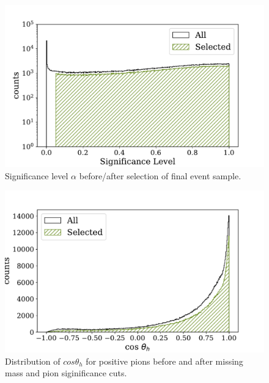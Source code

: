 \begin{figure}
  \begin{center}
    \includegraphics[width=\columnwidth]{image/significance.pdf}
    \caption{Significance level $\alpha$ before/after selection of final event sample.}
  \end{center}
\end{figure}

\begin{figure}
  \begin{center}
    \includegraphics[width=\columnwidth]{image/cos_theta_h.pdf}
    \caption{Distribution of $cos \theta_h$ for positive pions before and after missing mass and pion siginificance cuts.}
  \end{center}
\end{figure}


